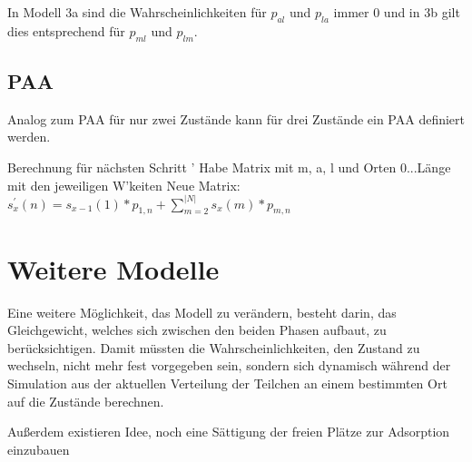 In Modell 3a sind die Wahrscheinlichkeiten für $p_{al}$ und $p_{la}$ immer $0$ und in 3b gilt dies entsprechend für $p_{ml}$ und $p_{lm}$.

\subsection{PAA}

Analog zum PAA für nur zwei Zustände kann für drei Zustände ein PAA definiert werden. 


Berechnung für nächsten Schritt '
Habe Matrix mit m, a, l und Orten 0...Länge mit den jeweiligen W'keiten
Neue Matrix:
$s^{'}_x(n) = s_{x-1}(1) * p_{1,n} + \sum^{|N|}_{m=2}{s_x(m) * p_{m,n}}$


\section{Weitere Modelle}

Eine weitere Möglichkeit, das Modell zu verändern, besteht darin, das Gleichgewicht, welches sich zwischen den beiden Phasen aufbaut, zu berücksichtigen. Damit müssten die Wahrscheinlichkeiten, den Zustand zu wechseln, nicht mehr fest vorgegeben sein, sondern sich dynamisch während der Simulation aus der aktuellen Verteilung der Teilchen an einem bestimmten Ort auf die Zustände berechnen.

Außerdem existieren Idee, noch eine Sättigung der freien Plätze zur Adsorption einzubauen


